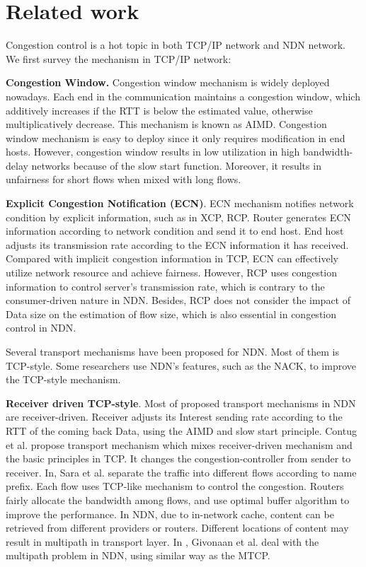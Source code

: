 
\section{Related work}
\label{sec:related}

Congestion control is a hot topic in both TCP/IP network and NDN network. We first survey the mechanism in TCP/IP network:

\textbf{Congestion Window.} Congestion window mechanism is widely deployed nowadays. Each end in the communication maintains a congestion window, which additively increases if the RTT is below the estimated value, otherwise multiplicatively decrease. This mechanism is known as AIMD\cite{TCP}. Congestion window mechanism is easy to deploy since it only requires modification in end hosts. However, congestion window results in low utilization in high bandwidth-delay networks because of the slow start function. Moreover, it results in unfairness for short flows when mixed with long flows\cite{tcpdeadline}.

\textbf{Explicit Congestion Notification (ECN)}. ECN mechanism notifies network condition by explicit information, such as in XCP\cite{XCP}, RCP\cite{RCP}. Router generates ECN information according to network condition and send it to end host. End host adjusts its transmission rate according to the ECN information it has received. Compared with implicit congestion information in TCP, ECN can effectively utilize network resource and achieve fairness. However, RCP uses congestion information to control server's transmission rate, which is contrary to the consumer-driven nature in NDN. Besides, RCP does not consider the impact of Data size on the estimation of flow size, which is also essential in congestion control in NDN.

Several transport mechanisms have been proposed for NDN. Most of them is TCP-style. Some researchers use NDN's features, such as the NACK, to improve the TCP-style mechanism.

\textbf{Receiver driven TCP-style}. Most of proposed transport mechanisms in NDN are receiver-driven. Receiver adjusts its Interest sending rate according to the RTT of the coming back Data, using the AIMD and slow start principle\cite{NDNanalysis}. Contug et al.\cite{Contug} propose transport mechanism which mixes receiver-driven mechanism and the basic principles in TCP. It changes the congestion-controller from sender to receiver. In\cite{Flow}, Sara et al. separate the traffic into different flows according to name prefix. Each flow uses TCP-like mechanism to control the congestion. Routers fairly allocate the bandwidth among flows, and use optimal buffer algorithm to improve the performance. In NDN, due to in-network cache, content can be retrieved from different providers or routers. Different locations of content may result in multipath in transport layer. In \cite{Multipath}, Givonaan et al. deal with the multipath problem in NDN, using similar way as the MTCP.

